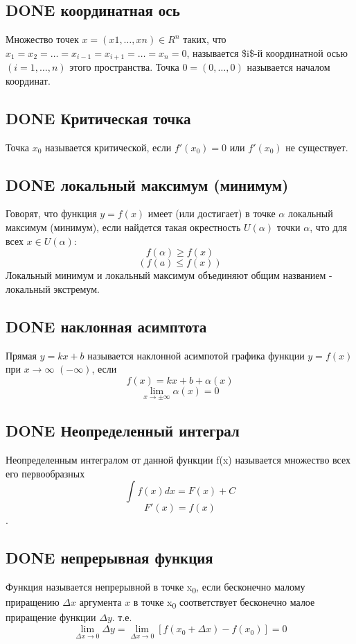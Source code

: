 \documentclass[11pt]{article}
\begin{document}
\subsection{{\bfseries\sffamily DONE} координатная ось}
\label{sec:orgb8490d2}
Множество точек \(x=(x1,…,xn)\in R^n\) таких, что \(x_1=x_2=…=x_{i−1}=x_{i+1}=…=x_{n}=0\), называется \$i\$-й координатной осью \((i=1,…,n)\) этого пространства. Точка \(0=(0,…,0)\) называется началом координат.
\subsection{{\bfseries\sffamily DONE} Критическая точка}
\label{sec:orgc96ad32}
Точка \(x_0\) называется критической, если \(f'(x_0)=0\) или \(f'(x_0)\) не существует.
\subsection{{\bfseries\sffamily DONE} локальный максимум (минимум)}
\label{sec:orga38f5b0}
Говорят, что функция \(y=f(x)\) имеет (или достигает) в точке \(\alpha\) локальный максимум (минимум), если найдется такая окрестность \(U(\alpha)\) точки \(\alpha\), что для всех \(x\in U(\alpha)\):
$$f(\alpha)\geq f(x)$$ 
$$(f(a)\leq f(x))$$
Локальный минимум и локальный максимум объединяют общим названием - локальный экстремум.
\subsection{{\bfseries\sffamily DONE} наклонная асимптота}
\label{sec:org36da33a}
Прямая \(y=kx+b\) называется наклонной асимпотой графика функции \(y=f(x)\) при \(x\to \infty\) \((-\infty)\), если
$$f(x)=kx+b+\alpha(x)$$
$$\lim\limits_{x\to\pm\infty}\alpha(x)=0$$
\subsection{{\bfseries\sffamily DONE} Неопределенный интеграл}
\label{sec:org838bac5}
Неопределенным интегралом от данной функции f(x) называется множество всех его первообразных
$$\int f(x)dx=F(x)+C$$
$$F'(x)=f(x)$$.
\subsection{{\bfseries\sffamily DONE} непрерывная функция}
\label{sec:orgf394a24}
Функция называется непрерывной в точке x\textsubscript{0}, если бесконечно малому приращению \(\Delta x\) аргумента \(x\) в точке x\textsubscript{0} соответствует бесконечно малое приращение функции \(\Delta y\). т.е.
$$\lim\limits_{\Delta x\to 0}\Delta y=\lim\limits_{\Delta x\to 0}[f(x_0+\Delta x)−f(x_0)]=0$$
\end{document}
